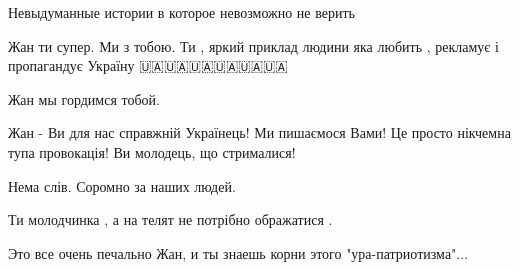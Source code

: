 \begin{itemize}
Невыдуманные истории в которое невозможно не верить

 
Жан ти супер. Ми з тобою. Ти , яркий приклад людини яка любить , рекламує і пропагандує Україну 🇺🇦🇺🇦🇺🇦🇺🇦🇺🇦🇺🇦🤝

 
Жан мы гордимся тобой.

 
Жан - Ви для нас справжній Українець! Ми пишаємося Вами! Це просто нікчемна тупа провокація! Ви молодець, що стрималися!

 
Нема слів. Соромно за наших людей.

 
Ти молодчинка , а на телят не потрібно ображатися .

 
Это все очень печально Жан, и ты знаешь корни этого "ура-патриотизма"...

 

\end{itemize}
